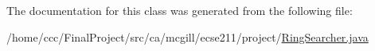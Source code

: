 The documentation for this class was generated from the following file\+:\begin{DoxyCompactItemize}
\item 
/home/ccc/\+Final\+Project/src/ca/mcgill/ecse211/project/\hyperlink{_ring_searcher_8java}{Ring\+Searcher.\+java}\end{DoxyCompactItemize}
